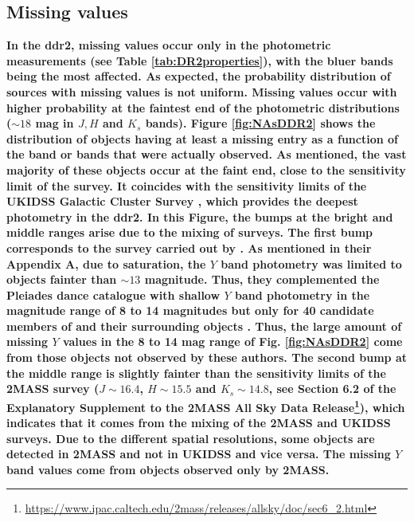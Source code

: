 \subsection{Missing values}
\textbf{In the \gls{ddr2}, missing values occur only in the photometric measurements (see Table \ref{tab:DR2properties}), with the bluer bands being the most affected. As expected, the probability distribution of sources with missing values is not uniform. Missing values occur with higher probability at the faintest end of the photometric distributions ($\sim 18$ mag in $J,H$ and $K_s$ bands). Figure \ref{fig:NAsDDR2} shows the distribution of objects having at least a missing entry as a function of the band or bands that were actually observed. As mentioned, the vast majority of these objects occur at the faint end, close to the sensitivity limit of the survey. It coincides with the sensitivity limits of the UKIDSS Galactic Cluster Survey \cite[$Y\sim 20.3$, $J\sim19.5$, $H\sim K_s\sim18.6$ according to][]{2007MNRAS.379.1599L}, which provides the deepest photometry in the \gls{ddr2}. In this Figure, the bumps at the bright and middle ranges arise due to the mixing of surveys. The first bump corresponds to the survey carried out by \citet{Bouy2015}. As mentioned in their Appendix A, due to saturation, the $Y$ band photometry was limited to objects fainter than $\sim 13$ magnitude. Thus, they complemented the Pleiades \gls{dance} catalogue with shallow $Y$ band photometry in the magnitude range of 8 to 14 magnitudes but only for 40 candidate members of \citet{Stauffer2007} and their surrounding objects \cite[see][for more details]{Bouy2015}. Thus, the large amount of missing $Y$ values in the 8 to 14 mag range of Fig. \ref{fig:NAsDDR2} come from those objects not observed by these authors. The second bump at the middle range is slightly fainter than the sensitivity limits of the 2MASS survey ($J\sim 16.4$, $H\sim15.5$ and $K_s \sim 14.8$, see Section 6.2 of the Explanatory Supplement to the 2MASS All Sky Data Release\footnote{\url{https://www.ipac.caltech.edu/2mass/releases/allsky/doc/sec6_2.html}}), which indicates that it comes from the mixing of the 2MASS and UKIDSS surveys. Due to the different spatial resolutions, some objects are detected in 2MASS and not in UKIDSS and vice versa. The missing $Y$ band values come from objects observed only by 2MASS.}

